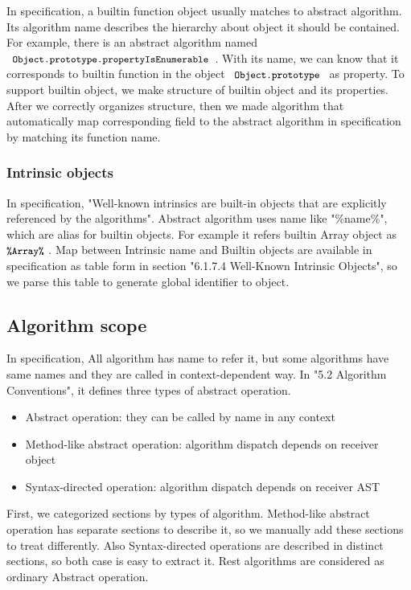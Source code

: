  In specification, a builtin function object usually matches to abstract algorithm. Its algorithm name
 describes the hierarchy about object it should be contained. For example, there is an abstract algorithm named \( \code{ Object.prototype.propertyIsEnumerable } \). With its name,
 we can know that it corresponds to builtin function in the object \( \code{ Object.prototype } \) as property.
 To support builtin object, we make structure of builtin object and its properties.
 After we correctly organizes structure, then we made algorithm that automatically map corresponding field to the abstract algorithm in specification by matching its function name.
 
 \subsubsection{Intrinsic objects}

 In specification, "Well-known intrinsics are built-in objects that are explicitly referenced by the algorithms".
 Abstract algorithm uses name like "\%name\%", which are alias for builtin objects. For example it refers builtin Array object as \( \texttt{\small\%Array\%} \) .
 Map between Intrinsic name and Builtin objects are available in specification as table form in section "6.1.7.4 Well-Known Intrinsic Objects", so we parse this table to generate global identifier to object.

\subsection{Algorithm scope}

 In specification, All algorithm has name to refer it, but some algorithms have same names and they are called in context-dependent way.
In "5.2 Algorithm Conventions", it defines three types of abstract operation.
 \begin{itemize}
  \item Abstract operation: they can be called by name in any context
  \item Method-like abstract operation: algorithm dispatch depends on receiver object
  \item Syntax-directed operation: algorithm dispatch depends on receiver AST
  \end{itemize}

First, we categorized sections by types of algorithm.
Method-like abstract operation has separate sections to describe it, so we manually add these sections to treat differently.
Also Syntax-directed operations are described in distinct sections, so both case is easy to extract it.
Rest algorithms are considered as ordinary Abstract operation.


